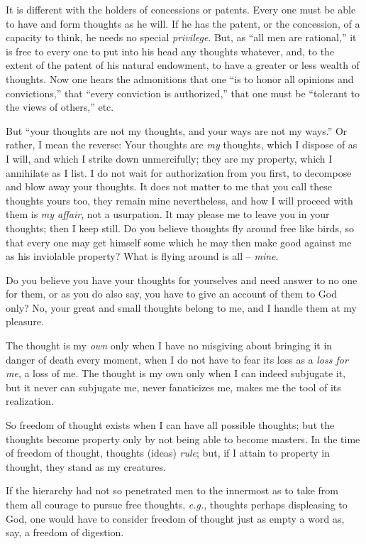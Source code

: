It is different with the holders of concessions or patents. Every one must be 
able to have and form thoughts as he will. If he has the patent, or the 
concession, of a capacity to think, he needs no special \textit{privilege}. 
But, as ``all men are rational,'' it is free to every one to put into his 
head any thoughts whatever, and, to the extent of the patent of his natural 
endowment, to have a greater or less wealth of thoughts. Now one hears the 
admonitions that one ``is to honor all opinions and convictions,'' that 
``every conviction is authorized,'' that one must be ``tolerant to the 
views of others,'' etc.

But ``your thoughts are not my thoughts, and your ways are not my ways.'' Or 
rather, I mean the reverse: Your thoughts are \textit{my} thoughts, which I 
dispose of as I will, and which I strike down unmercifully; they are my 
property, which I annihilate as I list. I do not wait for authorization from 
you first, to decompose and blow away your thoughts. It does not matter to me 
that you call these thoughts yours too, they remain mine nevertheless, and how 
I will proceed with them is \textit{my affair}, not a usurpation. It may 
please me to leave you in your thoughts; then I keep still. Do you believe 
thoughts fly around free like birds, so that every one may get himself some 
which he may then make good against me as his inviolable property? What is 
flying around is all -- \textit{mine}.

Do you believe you have your thoughts for yourselves and need answer to no one 
for them, or as you do also say, you have to give an account of them to God 
only? No, your great and small thoughts belong to me, and I handle them at my 
pleasure.

The thought is my \textit{own} only when I have no misgiving about bringing it 
in danger of death every moment, when I do not have to fear its loss as a 
\textit{loss for me}, a loss of me. The thought is my own only when I can 
indeed subjugate it, but it never can subjugate me, never fanaticizes me, 
makes me the tool of its realization.

So freedom of thought exists when I can have all possible thoughts; but the 
thoughts become property only by not being able to become masters. In the time 
of freedom of thought, thoughts (ideas) \textit{rule}; but, if I attain to 
property in thought, they stand as my creatures.

If the hierarchy had not so penetrated men to the innermost as to take from 
them all courage to pursue free thoughts, \textit{e.g.}, thoughts perhaps 
displeasing to God, one would have to consider freedom of thought just as 
empty a word as, say, a freedom of digestion.

